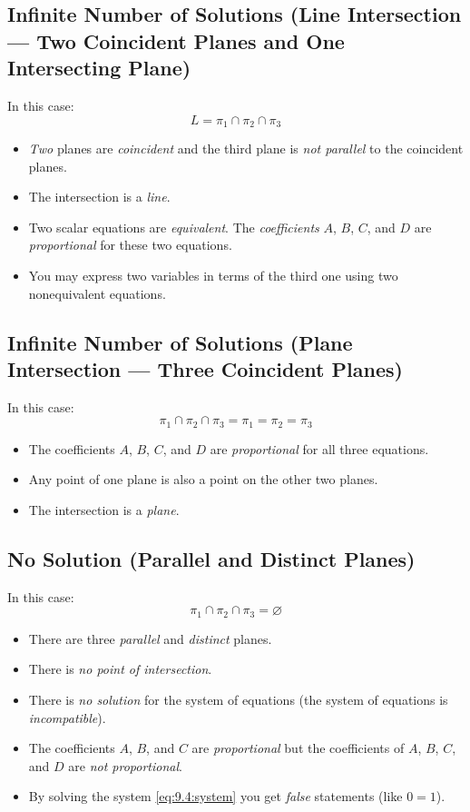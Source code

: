 \subsection{Infinite Number of Solutions (Line Intersection --- Two Coincident Planes and One Intersecting Plane)}
	In this case:
	\[L = \pi_1 \cap \pi_2 \cap \pi_3\]
	\begin{itemize}
		\item \emph{Two} planes are \emph{coincident} and the third plane is \emph{not parallel} to the coincident planes.
		\item The intersection is a \emph{line}.
		\item Two scalar equations are \emph{equivalent}. The \emph{coefficients} $A$, $B$, $C$, and $D$ are \emph{proportional} for these two equations.
		\item You may express two variables in terms of the third one using two nonequivalent equations.
	\end{itemize}
\subsection{Infinite Number of Solutions (Plane Intersection --- Three Coincident Planes)}
	In this case:
	\[\pi_1 \cap \pi_2 \cap \pi_3 = \pi_1 = \pi_2 = \pi_3\]
	\begin{itemize}
		\item The coefficients $A$, $B$, $C$, and $D$ are \emph{proportional} for all three equations.
		\item Any point of one plane is also a point on the other two planes.
		\item The intersection is a \emph{plane}.
	\end{itemize}
\subsection{No Solution (Parallel and Distinct Planes)}
	In this case:
	\[\pi_1 \cap \pi_2 \cap \pi_3 = \varnothing\]
	\begin{itemize}
		\item There are three \emph{parallel} and \emph{distinct} planes.
		\item There is \emph{no point of intersection}.
		\item There is \emph{no solution} for the system of equations (the system of equations is \emph{incompatible}).
		\item The coefficients $A$, $B$, and $C$ are \emph{proportional} but the coefficients of $A$, $B$, $C$, and $D$ are \emph{not proportional}.
		\item By solving the system \eqref{eq:9.4:system} you get \emph{false} statements (like $0 = 1$).
	\end{itemize}
